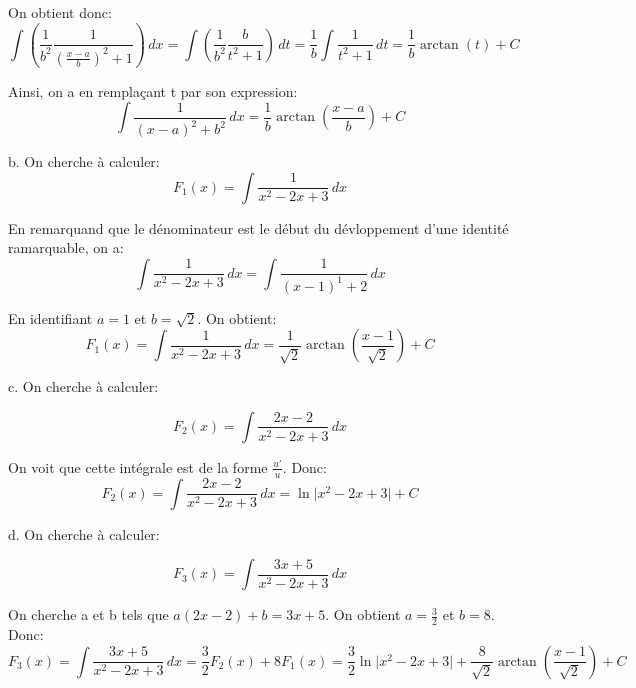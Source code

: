\documentclass[12pt,a4paper, french]{article}
\begin{document}
On obtient donc: 
\begin{equation*}
    \int \left( \frac{1}{b^2}\frac{1}{(\frac{x-a}{b})^2+1} \right)\,dx=\int \left(\frac{1}{b^2} \frac{b}{t^2+1}\right)\,dt=\frac{1}{b}\int \frac{1}{t^2+1}\,dt= \frac{1}{b}\arctan(t)+C
\end{equation*}

Ainsi, on a en remplaçant t par son expression: 
\begin{equation*}
    \int \frac{1}{(x-a)^2+b^2} \,dx=\frac{1}{b}\arctan \left(\frac{x-a}{b}\right)+C
\end{equation*}

b. On cherche à calculer: 
\begin{equation*}
    F_1(x)=\int \frac{1}{x^2-2x+3}\,dx 
\end{equation*}

En remarquand que le dénominateur est le début du dévloppement d'une identité ramarquable, on a:
\begin{equation*}
    \int \frac{1}{x^2-2x+3}\,dx = \int \frac{1}{(x-1)^1+2}\,dx
\end{equation*}

En identifiant \begin{math}
    a=1
\end{math} et \begin{math}
    b=\sqrt{2}
\end{math}. On obtient:
\begin{equation*}
    F_1(x)=\int \frac{1}{x^2-2x+3}\,dx=\frac{1}{\sqrt{2}}\arctan\left(\frac{x-1}{\sqrt{2}}\right)+C
\end{equation*}

c. On cherche à calculer: 

\begin{equation*}
    F_2(x)=\int \frac{2x-2}{x^2-2x+3}\,dx
\end{equation*}

On voit que cette intégrale est de la forme \begin{math}
    \frac{u'}{u}
\end{math}. Donc:
\begin{equation*}
    F_2(x)=\int \frac{2x-2}{x^2-2x+3}\,dx=\ln\lvert x^2-2x+3\rvert +C
\end{equation*}

d. On cherche à calculer:

\begin{equation*}
    F_3(x)=\int \frac{3x+5}{x^2-2x+3}\,dx
\end{equation*}

On cherche a et b tels que \begin{math}
    a(2x-2)+b=3x+5
\end{math}. On obtient \begin{math}
    a=\frac{3}{2}
\end{math} et \begin{math}
    b=8
\end{math}. Donc:
\begin{equation*}
    F_3(x)=\int \frac{3x+5}{x^2-2x+3}\,dx=\frac{3}{2}F_2(x)+8F_1(x)=\frac{3}{2}\ln\lvert x^2-2x+3\rvert+\frac{8}{\sqrt{2}}\arctan\left(\frac{x-1}{\sqrt{2}}\right)+C
\end{equation*}
\end{document}
